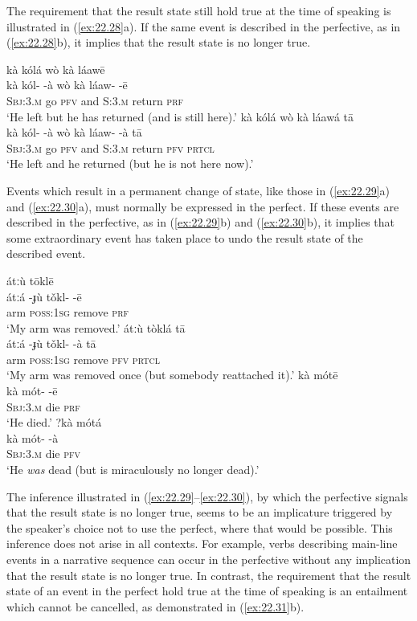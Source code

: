 The requirement that the result state still hold true at the time of speaking is illustrated in (\ref{ex:22.28}a). If the same event is described in the perfective, as in (\ref{ex:22.28}b), it implies that the result state is no longer true.


\ea \label{ex:22.28}
\ea  \glll kà  kólá  {}  wò  kà  láawē\\
kà  kól-  -à  wò  kà  láaw-  -ē\\
\textsc{Sbj:3.m}  go  \textsc{pfv}  and  \textsc{S:3.m}  return  \textsc{prf}\\
\glt ‘He left but he has returned (and is still here).’
\ex \glll   kà  kólá  {}  wò  kà  láawá  {}  tā\\
kà  kól-  -à  wò  kà  láaw-  -à  tā\\
\textsc{Sbj:3.m}  go  \textsc{pfv}  and  \textsc{S:3.m}  return  \textsc{pfv}  \textsc{prtcl}\\
\glt ‘He left and he returned (but he is not here now).’
\z \z


Events which result in a permanent change of state, like those in (\ref{ex:22.29}a) and (\ref{ex:22.30}a), must normally be expressed in the perfect. If these events are described in the perfective, as in (\ref{ex:22.29}b) and (\ref{ex:22.30}b), it implies that some extraordinary event has taken place to undo the result state of the described event.


\ea \label{ex:22.29}
\ea  \glll átːù  {}  tōklē\\
átːá  -ɟù  tǒkl-  -ē\\
arm  \textsc{poss:1sg}  remove  \textsc{prf}\\
\glt ‘My arm was removed.’
\ex \glll  átːù  {}  tòklá  {}  tā\\
átːá  -ɟù  tǒkl-  -à  tā\\
arm  \textsc{poss:1sg}  remove  \textsc{pfv}  \textsc{prtcl}\\
\glt ‘My arm was removed once (but somebody reattached it).’
\z 
\ex \label{ex:22.30}
\ea  \glll kà  mótē\\
kà  mót-  -ē\\
\textsc{Sbj:3.m}  die  \textsc{prf}\\
\glt ‘He died.’
\ex \glll ?kà  mótá\\
 kà  mót-  -à\\
\textsc{Sbj:3.m}  die  \textsc{pfv}\\
\glt ‘He \textit{was} dead (but is miraculously no longer dead).’
\z \z


The inference illustrated in (\ref{ex:22.29}--\ref{ex:22.30}), by which the perfective signals that the result state is no longer true, seems to be an implicature triggered by the speaker’s choice not to use the perfect, where that would be possible. This inference does not arise in all contexts. For example, verbs describing main-line events in a narrative sequence can occur in the perfective without any implication that the result state is no longer true. In contrast, the requirement that the result state of an event in the perfect hold true at the time of speaking is an entailment which cannot be cancelled, as demonstrated in (\ref{ex:22.31}b).

